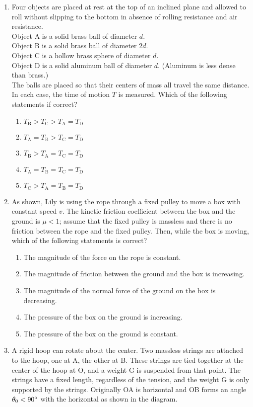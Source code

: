 \documentclass[12pt,letterpaper]{article}
\begin{document}
\begin{enumerate}[resume]
\item
Four objects are placed at rest at the top of an inclined plane and allowed to roll without slipping to the bottom in absence of rolling resistance and air resistance.\\
Object A is a solid brass ball of diameter $d$.\\
Object B is a solid brass ball of diameter $2d$.\\
Object C is a hollow brass sphere of diameter $d$.\\
Object D is a solid aluminum ball of diameter $d$. (Aluminum is less dense than brass.)\\
The balls are placed so that their centers of mass all travel the same distance. In each case, the time of motion $T$ is measured. Which of the following statements if correct?
\begin{enumerate}
\item $T_\text{B} > T_\text{C} > T_\text{A} = T_\text{D}$
\item $T_\text{A} = T_\text{B} > T_\text{C} = T_\text{D}$
\item $T_\text{B} > T_\text{A} = T_\text{C} = T_\text{D}$
\item $T_\text{A} = T_\text{B} = T_\text{C} = T_\text{D}$
\item $T_\text{C} > T_\text{A} = T_\text{B} = T_\text{D}$
\end{enumerate}

\item
As shown, Lily is using the rope through a fixed pulley to move a box with constant speed $v$. The kinetic friction coefficient between the box and the ground is $\mu <1$; assume that the fixed pulley is massless and there is no friction between the rope and the fixed pulley. Then, while the box is moving, which of the following statements is correct?
\begin{enumerate}
\item The magnitude of the force on the rope is constant.
\item The magnitude of friction between the ground and the box is increasing.
\item The magnitude of the normal force of the ground on the box is decreasing.
\item The pressure of the box on the ground is increasing.
\item The pressure of the box on the ground is constant.
\end{enumerate}

\item
A rigid hoop can rotate about the center. Two massless strings are attached to the hoop, one at A, the other at B. These strings are tied together at the center of the hoop at O, and a weight G is suspended from that point. The strings have a fixed length, regardless of the tension, and the weight G is only supported by the strings. Originally OA is horizontal and OB forms an angle $\theta_0 < 90\degree$ with the horizontal as shown in the diagram.\\


\end{enumerate}
\end{document}
